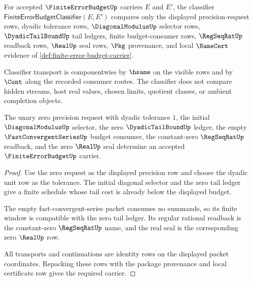 \begin{definition}
\label{def:finite-error-budget-classifier}
For accepted $\FiniteErrorBudgetUp$ carriers $E$ and $E'$, the classifier
$\mathsf{FiniteErrorBudgetClassifier}(E,E')$ compares only the displayed
precision-request rows, dyadic tolerance rows, $\DiagonalModulusUp$ selector
rows, $\DyadicTailBoundUp$ tail ledgers, finite budget-consumer rows,
$\RegSeqRatUp$ readback rows, $\RealUp$ seal rows, $\Pkg$ provenance, and local
$\NameCert$ evidence of \autoref{def:finite-error-budget-carrier}.

Classifier transport is componentwise by $\hsame$ on the visible rows and by
$\Cont$ along the recorded consumer routes. The classifier does not compare
hidden streams, host real values, chosen limits, quotient classes, or ambient
completion objects.
\end{definition}

\begin{theorem}
\label{thm:finite-error-budget-zero-seed}
The unary zero precision request with dyadic tolerance $1$, the initial
$\DiagonalModulusUp$ selector, the zero $\DyadicTailBoundUp$ ledger, the empty
$\FastConvergentSeriesUp$ budget consumer, the constant-zero $\RegSeqRatUp$
readback, and the zero $\RealUp$ seal determine an accepted
$\FiniteErrorBudgetUp$ carrier.
\end{theorem}
\begin{proof}
Use the zero request as the displayed precision row and choose the dyadic unit
row as the tolerance. The initial diagonal selector and the zero tail ledger
give a finite schedule whose tail cost is already below the displayed budget.

The empty fast-convergent-series packet consumes no summands, so its finite
window is compatible with the zero tail ledger. Its regular rational readback
is the constant-zero $\RegSeqRatUp$ name, and the real seal is the corresponding
zero $\RealUp$ row.

All transports and continuations are identity rows on the displayed packet
coordinates. Repacking these rows with the package provenance and local
certificate row gives the required carrier.
\end{proof}

